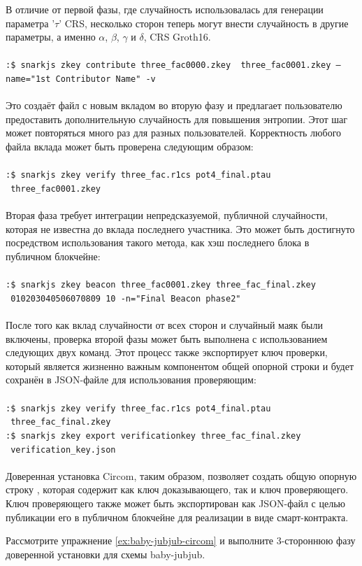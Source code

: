 \begin{example}
В отличие от первой фазы, где случайность использовалась для генерации параметра '$\tau$' CRS, несколько сторон теперь могут внести случайность в другие параметры, а именно $\alpha$, $\beta$, $\gamma$ и $\delta$, CRS Groth16.
\\
\\
\texttt{:\$ snarkjs zkey contribute three\_fac0000.zkey \ three\_fac0001.zkey --name="1st Contributor Name" -v}
\\
\\
Это создаёт файл с новым вкладом во вторую фазу и предлагает пользователю предоставить дополнительную случайность для повышения энтропии. Этот шаг может повторяться много раз для разных пользователей. Корректность любого файла вклада может быть проверена следующим образом:
\\
\\
\texttt{:\$ snarkjs zkey verify three\_fac.r1cs pot4\_final.ptau \ three\_fac0001.zkey}
\\
\\
Вторая фаза требует интеграции непредсказуемой, публичной случайности, которая не известна до вклада последнего участника. Это может быть достигнуто посредством использования такого метода, как хэш последнего блока в публичном блокчейне:
\\
\\
\texttt{:\$ snarkjs zkey beacon three\_fac0001.zkey three\_fac\_final.zkey \
010203040506070809 10 -n="Final Beacon phase2"}
\\
\\
После того как вклад случайности от всех сторон и случайный маяк были включены, проверка второй фазы может быть выполнена с использованием следующих двух команд. Этот процесс также экспортирует ключ проверки, который является жизненно важным компонентом общей опорной строки и будет сохранён в JSON-файле для использования проверяющим:
\\
\\
\texttt{:\$ snarkjs zkey verify three\_fac.r1cs pot4\_final.ptau \ three\_fac\_final.zkey}\\
\texttt{:\$ snarkjs zkey export verificationkey three\_fac\_final.zkey \ verification\_key.json}
\\
\\
Доверенная установка Circom, таким образом, позволяет создать общую опорную строку , которая содержит как ключ доказывающего, так и ключ проверяющего. Ключ проверяющего также может быть экспортирован как JSON-файл  с целью публикации его в публичном блокчейне для реализации в виде смарт-контракта.
\end{example}
\begin{exercise} 
\label{ex:baby-jubjub-circom-setupt}
Рассмотрите упражнение \ref{ex:baby-jubjub-circom} и выполните 3-стороннюю фазу доверенной установки для схемы baby-jubjub.
\end{exercise}

